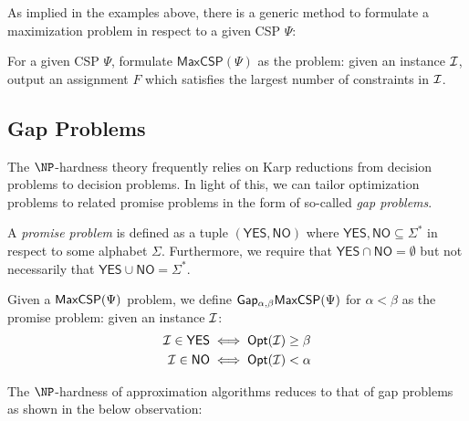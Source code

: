  As implied in the examples above, there is a generic method to formulate a maximization problem in respect to a given CSP $\Psi$:
  \begin{definition}
    For a given CSP $\Psi$, formulate $\mathsf{MaxCSP}(\Psi)$ as the problem: given an instance $\mathcal{I}$, output an assignment $F$ which satisfies the largest number of constraints in $\mathcal{I}$.
  \end{definition}

\subsection{Gap Problems}

The $\NP$-hardness theory frequently relies on Karp reductions from decision problems to decision problems. In light of this, we can tailor optimization problems to related promise problems in the form of so-called \emph{gap problems}.

\begin{definition} \label{promiseDef}
  A \emph{promise problem} is defined as a tuple $(\mathsf{YES}, \mathsf{NO})$ where $\mathsf{YES},\mathsf{NO} \subseteq \Sigma^*$ in respect to some alphabet $\Sigma$. Furthermore, we require that $\mathsf{YES} \cap \mathsf{NO} = \emptyset$ but not necessarily that $\mathsf{YES} \cup \mathsf{NO} = \Sigma^*$.
\end{definition}

\begin{definition} \label{gapDef}
  Given a $\mathsf{MaxCSP}(\Psi)$ problem, we define $\mathsf{Gap_{\alpha,\beta}}\mathsf{MaxCSP}(\Psi)$ for $\alpha < \beta$ as the promise problem: given an instance $\mathcal{I}$:
  \begin{align}
      \mathcal{I} \in \mathsf{YES} & \iff \mathsf{Opt}(\mathcal{I}) \geq \beta \\
        \mathcal{I} \in \mathsf{NO} & \iff \mathsf{Opt}(\mathcal{I}) < \alpha
  \end{align}
\end{definition}

The $\NP$-hardness of approximation algorithms reduces to that of gap problems as shown in the below observation:

